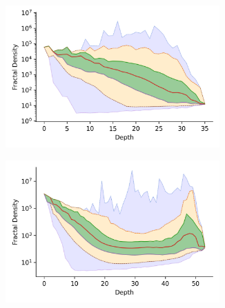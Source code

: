 \documentclass[review,supplement,onefignum,onetabnum]{siamonline220329}
\begin{document}
\begin{figure}
    \captionsetup[subfigure]{aboveskip=-15pt,belowskip=-3pt}
    \begin{subfigure}[b]{0.47\textwidth}
        \includegraphics[width=0.9\textwidth]{images/fractal_density/fashion-mnist.png}\\
        \label{fig:supplement:fashion-mnist-fractal_density}
    \end{subfigure}%
    \begin{subfigure}[b]{0.47\textwidth}
            \includegraphics[width=0.9\textwidth]{images/fractal_density/glove-25.png}\\
            \label{fig:supplement:glove-25-fractal_density}
    \end{subfigure}
    \\
    \begin{subfigure}[b]{0.47\textwidth}

\end{subfigure}
\end{figure}
\end{document}
